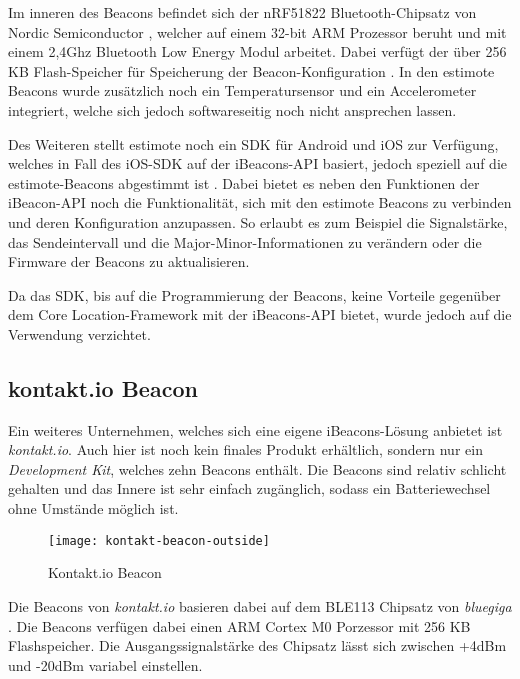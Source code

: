Im inneren des Beacons befindet sich der nRF51822 Bluetooth-Chipsatz von Nordic Semiconductor \cite{nordicchipset}, welcher auf einem 32-bit ARM Prozessor beruht und mit einem 2,4Ghz Bluetooth Low Energy Modul arbeitet. Dabei verfügt der über 256 KB Flash-Speicher für Speicherung der Beacon-Konfiguration \cite{estimotespecs} .
In den estimote Beacons wurde zusätzlich noch ein Temperatursensor und ein Accelerometer integriert, welche sich jedoch softwareseitig noch nicht ansprechen lassen.

Des Weiteren stellt estimote noch ein SDK für Android und iOS zur Verfügung, welches in Fall des iOS-SDK auf der iBeacons-API basiert, jedoch speziell auf die estimote-Beacons abgestimmt ist \cite{estimoteapi} . 
Dabei bietet es neben den Funktionen der iBeacon-API noch die Funktionalität, sich mit den estimote Beacons zu verbinden und deren Konfiguration anzupassen. So erlaubt es zum Beispiel die Signalstärke, das Sendeintervall und die Major-Minor-Informationen zu verändern oder die Firmware der Beacons zu aktualisieren.

Da das SDK, bis auf die Programmierung der Beacons, keine Vorteile gegenüber dem Core Location-Framework mit der iBeacons-API bietet, wurde jedoch auf die Verwendung verzichtet.

\subsection{kontakt.io Beacon}
\label{sec:dataandmeasurement:mobilebeacon:kontaktio}
Ein weiteres Unternehmen, welches sich eine eigene iBeacons-Lösung anbietet ist \emph{kontakt.io}. Auch hier ist noch kein finales Produkt erhältlich, sondern nur ein \emph{Development Kit}, welches zehn Beacons enthält. 
Die Beacons sind relativ schlicht gehalten und das Innere ist sehr einfach zugänglich, sodass ein Batteriewechsel ohne Umstände möglich ist.


\begin{figure}[htb!]
		\centering
	\texttt{[image: kontakt-beacon-outside]}
	\caption{Kontakt.io Beacon}
	\label{kontakt-beacon-outside}
\end{figure}

Die Beacons von \emph{kontakt.io} basieren dabei auf dem BLE113 Chipsatz von \emph{bluegiga} \cite{bluegigachipset}. Die Beacons verfügen dabei einen ARM Cortex M0 Porzessor mit 256 KB Flashspeicher. Die Ausgangssignalstärke des Chipsatz lässt sich zwischen +4dBm und -20dBm variabel einstellen.


